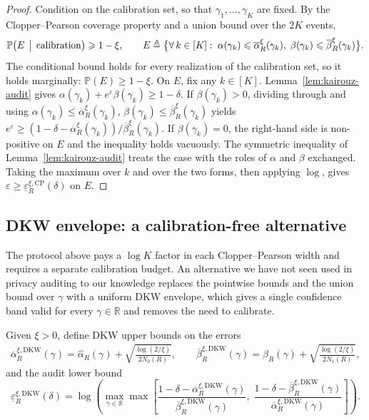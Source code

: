 \documentclass{article}
\theoremstyle{plain}
\theoremstyle{definition}
\theoremstyle{remark}
\newcommand{\RR}{\ensuremath{\mathbb{R}}}
\renewcommand{\leq}{\leqslant}
\renewcommand{\geq}{\geqslant}
\newcommand{\bP}{\mathbb{P}}
\begin{document}
\begin{proof}
    Condition on the calibration set, so that $\gamma_1,\dots,\gamma_K$ are fixed. By the Clopper--Pearson coverage property and a union bound over the $2K$ events,
    \[
        \bP\bigl(E \,\bigm|\, \text{calibration}\bigr) \geq 1 - \xi,
        \qquad
        E \triangleq \bigl\{\forall\,k \in [K]:\; \alpha(\gamma_k) \leq \overline{\alpha}_R^{\xi}(\gamma_k),\; \beta(\gamma_k) \leq \overline{\beta}_R^{\xi}(\gamma_k)\bigr\}.
    \]
    The conditional bound holds for every realization of the calibration set, so it holds marginally: $\bP(E) \geq 1 - \xi$. On $E$, fix any $k \in [K]$. Lemma~\ref{lem:kairouz-audit} gives $\alpha(\gamma_k) + e^{\varepsilon}\beta(\gamma_k) \geq 1-\delta$. If $\beta(\gamma_k) > 0$, dividing through and using $\alpha(\gamma_k) \leq \overline{\alpha}_R^{\xi}(\gamma_k)$, $\beta(\gamma_k) \leq \overline{\beta}_R^{\xi}(\gamma_k)$ yields $e^\varepsilon \geq (1-\delta-\overline{\alpha}_R^{\xi}(\gamma_k))/\overline{\beta}_R^{\xi}(\gamma_k)$. If $\beta(\gamma_k) = 0$, the right-hand side is non-positive on $E$ and the inequality holds vacuously. The symmetric inequality of Lemma~\ref{lem:kairouz-audit} treats the case with the roles of $\alpha$ and $\beta$ exchanged. Taking the maximum over $k$ and over the two forms, then applying $\log$, gives $\varepsilon \geq \underline{\varepsilon}_R^{\xi,\mathrm{CP}}(\delta)$ on $E$.
\end{proof}

\subsection{DKW envelope: a calibration-free alternative}\label{app:audit-dkw}

The protocol above pays a $\log K$ factor in each Clopper--Pearson width and requires a separate calibration budget. An alternative we have not seen used in privacy auditing to our knowledge replaces the pointwise bounds and the union bound over $\gamma$ with a uniform DKW envelope, which gives a single confidence band valid for every $\gamma \in \RR$ and removes the need to calibrate.

Given $\xi > 0$, define DKW upper bounds on the errors
\begin{align*}
    \overline{\alpha}_{R}^{\xi,\mathrm{DKW}}(\gamma)  = \widehat{\alpha}_{R}(\gamma) + \sqrt{\frac{\log(2/\xi)}{2N_0(R)}}, \qquad
    \overline{\beta}_{R}^{\xi,\mathrm{DKW}}(\gamma)   = \widehat{\beta}_{R}(\gamma) + \sqrt{\frac{\log(2/\xi)}{2N_1(R)}},
\end{align*}
and the audit lower bound
\begin{equation}
    \underline{\varepsilon}_{R}^{\xi,\mathrm{DKW}}(\delta) =  \log\left(\max_{\gamma \in \RR}\max\left[\frac{1 - \delta - \overline{\alpha}_R^{\xi,\mathrm{DKW}}(\gamma)}{\overline{\beta}_R^{\xi,\mathrm{DKW}}(\gamma)},\;\frac{1 - \delta - \overline{\beta}_R^{\xi,\mathrm{DKW}}(\gamma)}{\overline{\alpha}_R^{\xi,\mathrm{DKW}}(\gamma)}\right]\right). \label{eq:lb_epsilon_R_dkw}
\end{equation}
\end{document}
